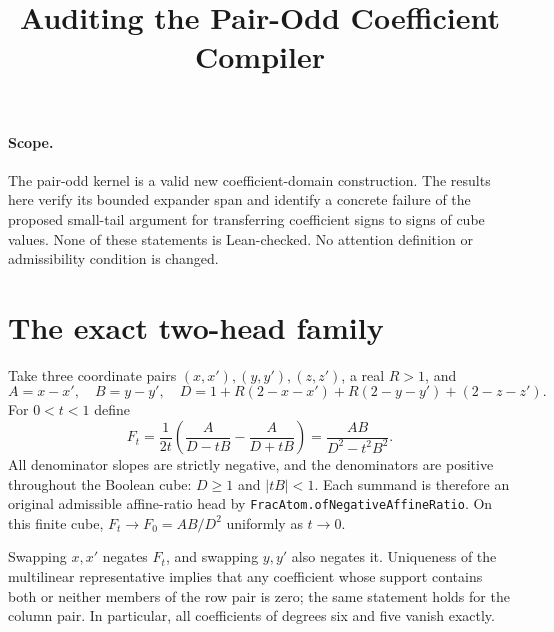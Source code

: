 \documentclass[11pt]{article}
\title{Auditing the Pair-Odd Coefficient Compiler}
\author{}
\date{}
\begin{document}
\maketitle

\paragraph{Scope.}
The pair-odd kernel is a valid new coefficient-domain construction.
The results here verify its bounded expander span and identify a concrete
failure of the proposed small-tail argument for transferring coefficient
signs to signs of cube values. None of these statements is Lean-checked.
No attention definition or admissibility condition is changed.

\section*{The exact two-head family}
Take three coordinate pairs $(x,x'),(y,y'),(z,z')$, a real $R>1$, and
\[
 A=x-x',\quad B=y-y',\quad
 D=1+R(2-x-x')+R(2-y-y')+(2-z-z').
\]
For $0<t<1$ define
\[
 F_t=\frac1{2t}\left(\frac{A}{D-tB}-\frac{A}{D+tB}\right)
     =\frac{AB}{D^2-t^2B^2}.
 \tag{1}
\]
All denominator slopes are strictly negative, and the denominators are
positive throughout the Boolean cube: $D\ge1$ and $|tB|<1$.
Each summand is therefore an original admissible affine-ratio head by
\texttt{FracAtom.ofNegativeAffineRatio}. On this finite cube,
$F_t\to F_0=AB/D^2$ uniformly as $t\to0$.

Swapping $x,x'$ negates $F_t$, and swapping $y,y'$ also negates it.
Uniqueness of the multilinear representative implies that any coefficient
whose support contains both or neither members of the row pair is zero;
the same statement holds for the column pair. In particular, all
coefficients of degrees six and five vanish exactly.
\end{document}
